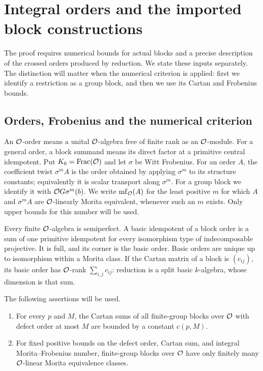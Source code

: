 \section{Integral orders and the imported block constructions}\label{sec:inputs}

The proof requires numerical bounds for actual blocks and a precise
description of the crossed orders produced by reduction.  We state
these inputs separately.  The distinction will matter when the
numerical criterion is applied: first we identify a restriction as a
group block, and then we use its Cartan and Frobenius bounds.

\subsection{Orders, Frobenius and the numerical criterion}

An $\mathcal O$-order means a unital $\mathcal O$-algebra free of finite rank as an
$\mathcal O$-module.  For a general order, a block summand means its direct
factor at a primitive central idempotent.  Put $K_0=\operatorname{Frac}(\mathcal O)$ and
let $\sigma$ be Witt
Frobenius.  For an order $A$, the coefficient twist $\sigma^m A$ is
the order obtained by applying $\sigma^m$ to its structure constants;
equivalently it is scalar transport along $\sigma^m$.  For a group
block we identify it with $\mathcal O G\sigma^m(b)$.  We write
$\operatorname{mf}_{\mathcal O}(A)$ for the least positive $m$ for which $A$ and
$\sigma^m A$ are $\mathcal O$-linearly Morita equivalent, whenever such an
$m$ exists.  Only upper bounds for this number will be used.

Every finite $\mathcal O$-algebra is semiperfect.  A basic idempotent of a
block order is a sum of one primitive idempotent for every isomorphism
type of indecomposable projective.  It is full, and its corner is the
basic order.  Basic orders are unique up to isomorphism within a
Morita class.  If the Cartan matrix of a block is $(c_{ij})$, its
basic order has $\mathcal O$-rank $\sum_{i,j}c_{ij}$: reduction is a split
basic $k$-algebra, whose dimension is that sum.

\begin{proposition}\label{prop:criteria}
The following assertions will be used.
\begin{enumerate}
\item For every $p$ and $M$, the Cartan sums of all finite-group
blocks over $\mathcal O$ with defect order at most $M$ are bounded by a
constant $c(p,M)$.
\item For fixed positive bounds on the defect order, Cartan sum,
and integral Morita--Frobenius number, finite-group blocks over
$\mathcal O$ have only finitely many $\mathcal O$-linear Morita equivalence
classes.
\end{enumerate}
\end{proposition}

